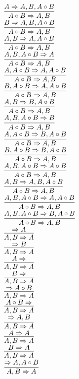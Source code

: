 \documentclass[11pt]{article}
\begin{document}
\begin{center}
\bigskip
\\$\infer{A\circ B\Rightarrow A, B}{A\Rightarrow A, B, A\circ B}$
\bigskip
\\$\infer{A\circ B\Rightarrow A, B}{B\Rightarrow A, B, A\circ B}$
\bigskip
\\$\infer{A\circ B\Rightarrow A, B}{A, B\Rightarrow A, A\circ B}$
\bigskip
\\$\infer{A\circ B\Rightarrow A, B}{A, B, A\circ B\Rightarrow A}$
\bigskip
\\$\infer{A\circ B\Rightarrow A, B}{A, A\circ B\Rightarrow A, A\circ B}$
\bigskip
\\$\infer{A\circ B\Rightarrow A, B}{B, A\circ B\Rightarrow A, A\circ B}$
\bigskip
\\$\infer{A\circ B\Rightarrow A, B}{A, B\Rightarrow B, A\circ B}$
\bigskip
\\$\infer{A\circ B\Rightarrow A, B}{A, B, A\circ B\Rightarrow B}$
\bigskip
\\$\infer{A\circ B\Rightarrow A, B}{A, A\circ B\Rightarrow B, A\circ B}$
\bigskip
\\$\infer{A\circ B\Rightarrow A, B}{B, A\circ B\Rightarrow B, A\circ B}$
\bigskip
\\$\infer{A\circ B\Rightarrow A, B}{A, B, A\circ B\Rightarrow A\circ B}$
\bigskip
\\$\infer{A\circ B\Rightarrow A, B}{A, B\Rightarrow A, B, A\circ B}$
\bigskip
\\$\infer{A\circ B\Rightarrow A, B}{A, B, A\circ B\Rightarrow A, A\circ B}$
\bigskip
\\$\infer{A\circ B\Rightarrow A, B}{A, B, A\circ B\Rightarrow B, A\circ B}$
\bigskip
\\$\infer{A, B\Rightarrow A}{\Rightarrow A}$
\bigskip
\\$\infer{A, B\Rightarrow A}{\Rightarrow B}$
\bigskip
\\$\infer{A, B\Rightarrow A}{A\Rightarrow }$
\bigskip
\\$\infer{A, B\Rightarrow A}{B\Rightarrow }$
\bigskip
\\$\infer{A, B\Rightarrow A}{\Rightarrow A\circ B}$
\bigskip
\\$\infer{A, B\Rightarrow A}{A\circ B\Rightarrow }$
\bigskip
\\$\infer{A, B\Rightarrow A}{\Rightarrow A, B}$
\bigskip
\\$\infer{A, B\Rightarrow A}{A\Rightarrow A}$
\bigskip
\\$\infer{A, B\Rightarrow A}{B\Rightarrow A}$
\bigskip
\\$\infer{A, B\Rightarrow A}{\Rightarrow A, A\circ B}$

\end{center}
\end{document}
